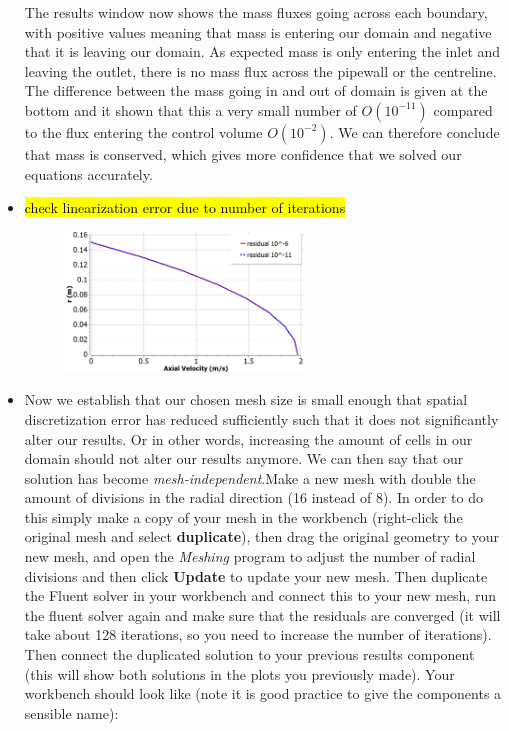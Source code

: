 \documentclass[11pt,a4paper,oneside,hidelinks]{scrartcl}
\newcommand\bfr[1]{\textcolor[rgb]{1,0.00,0.00}{\textbf{\textsf{#1}}}}
\begin{document}
\begin{itemize}
    The results window now shows the mass fluxes going across each boundary, with positive values meaning that mass is entering our domain and negative that it is leaving our domain. As expected mass is only entering the inlet and leaving the outlet, there is no mass flux across the pipewall or the centreline. The difference between the mass going in and out of domain is given at the bottom and it shown that this a very small number of $O(10^{-11})$ compared to the flux entering the control volume $O(10^{-2})$. We can therefore conclude that mass is conserved, which gives more confidence that we solved our equations accurately.
\item \hl{check linearization error due to number of iterations}
    \begin{figure}[H]
    \begin{center}
    \includegraphics[width=0.6\textwidth,clip]{residual_sensitivity.png}
    \end{center}
    \end{figure}

\item Now we establish that our chosen mesh size is small enough that spatial discretization error has reduced sufficiently such that it does not significantly alter our results. Or in other words, increasing the amount of cells in our domain should not alter our results anymore. We can then say that our solution has become \emph{mesh-independent}.Make a new mesh with double the amount of divisions in the radial direction (16 instead of 8). In order to do this simply make a copy of your mesh in the workbench (right-click the original mesh and select \bfr{duplicate}), then drag the original geometry to your new mesh, and open the \emph{Meshing} program to adjust the number of radial divisions and then click \bfr{Update} to update your new mesh. Then duplicate the Fluent solver in your workbench and connect this to your new mesh, run the fluent solver again and make sure that the residuals are converged (it will take about 128 iterations, so you need to increase the number of iterations). Then connect the duplicated solution to your previous results component (this will show both solutions in the plots you previously made). Your workbench should look like (note it is good practice to give the components a sensible name):


\end{itemize}
\end{document}
